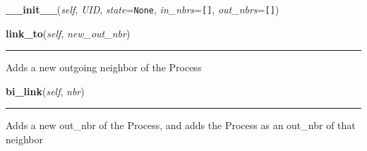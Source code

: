     \vspace{0.5ex}

\hspace{.8\funcindent}\begin{boxedminipage}{\funcwidth}

    \raggedright \textbf{\_\_init\_\_}(\textit{self}, \textit{UID}, \textit{state}={\tt None}, \textit{in\_nbrs}={\tt \texttt{[}\texttt{]}}, \textit{out\_nbrs}={\tt \texttt{[}\texttt{]}})

\setlength{\parskip}{2ex}
\setlength{\parskip}{1ex}
    \end{boxedminipage}

    \label{datk:core:distalgs:Process:link_to}

    \vspace{0.5ex}

\hspace{.8\funcindent}\begin{boxedminipage}{\funcwidth}

    \raggedright \textbf{link\_to}(\textit{self}, \textit{new\_out\_nbr})

    \vspace{-1.5ex}

    \rule{\textwidth}{0.5\fboxrule}
\setlength{\parskip}{2ex}
    Adds a new outgoing neighbor of the Process

\setlength{\parskip}{1ex}
    \end{boxedminipage}

    \label{datk:core:distalgs:Process:bi_link}

    \vspace{0.5ex}

\hspace{.8\funcindent}\begin{boxedminipage}{\funcwidth}

    \raggedright \textbf{bi\_link}(\textit{self}, \textit{nbr})

    \vspace{-1.5ex}

    \rule{\textwidth}{0.5\fboxrule}
\setlength{\parskip}{2ex}
    Adds a new out\_nbr of the Process, and adds the Process as an out\_nbr
    of that neighbor

\setlength{\parskip}{1ex}
    \end{boxedminipage}

